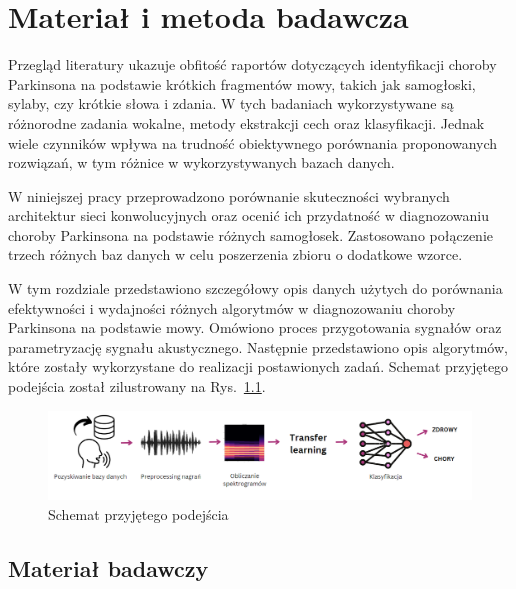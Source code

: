 \chapter{Materiał i metoda badawcza\@}
\label{ch:material-badawczy}

Przegląd literatury ukazuje obfitość raportów dotyczących identyfikacji choroby Parkinsona na podstawie krótkich fragmentów mowy, takich jak samogłoski, sylaby, czy krótkie słowa i zdania.
W tych badaniach wykorzystywane są różnorodne zadania wokalne, metody ekstrakcji cech oraz klasyfikacji.
Jednak wiele czynników wpływa na trudność obiektywnego porównania proponowanych rozwiązań, w tym różnice w wykorzystywanych bazach danych.

W niniejszej pracy przeprowadzono porównanie skuteczności wybranych architektur sieci konwolucyjnych oraz ocenić ich przydatność w diagnozowaniu choroby Parkinsona na podstawie różnych samogłosek.
Zastosowano  połączenie trzech różnych baz danych w celu poszerzenia zbioru o dodatkowe wzorce.

W tym rozdziale przedstawiono szczegółowy opis danych użytych do porównania efektywności i wydajności różnych algorytmów w diagnozowaniu choroby Parkinsona na podstawie mowy.
Omówiono proces przygotowania sygnałów oraz parametryzację sygnału akustycznego.
Następnie przedstawiono opis algorytmów, które zostały wykorzystane do realizacji postawionych zadań.
Schemat przyjętego podejścia został zilustrowany na Rys.~\ref{fig:methodology}.


\begin{figure}[htbp]
	\centering
	\includegraphics[width=1\textwidth]{./img/methodology}
	\caption{Schemat przyjętego podejścia\@}
    \label{fig:methodology}
\end{figure}


\section{Materiał badawczy}
\label{sec:material-badawczy}

